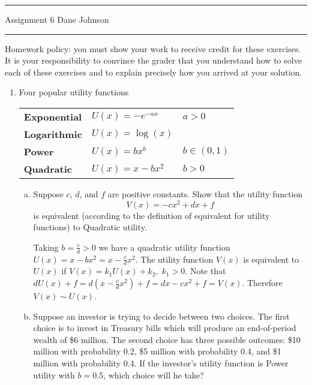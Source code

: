 \documentclass[letterpaper,12pt,fleqn]{article}
\begin{document}
\pagestyle{empty}

\hrule \vspace{0.5em}
 \hfill Assignment 6 \newline Dane Johnson \newline \hrule

\vspace{1em}

Homework policy: you must show your work to receive credit for these exercises.  It is your responsibility to convince the grader that you understand how to solve each of these exercises and to explain precisely how you arrived at your solution.

\vspace{1em}

\begin{enumerate}
\item Four popular utility functions

\begin{tabular}{lll}
\textbf{Exponential} & $U(x) = -e^{-ax}$ & $a > 0$\\
\textbf{Logarithmic} & $U(x) = \log(x)$ & \\
\textbf{Power} & $U(x) = b x^{b}$ & $b \in (0, 1)$ \\
\textbf{Quadratic} & $U(x) = x - bx^{2}$ \hspace{2em} & $b > 0$
\end{tabular}

\vspace{1em}

\begin{enumerate}[a)]
\item Suppose $c$, $d$, and $f$ are positive constants. Show that the utility function
\begin{equation*}
V(x) = -c x^{2} + d x + f
\end{equation*}
is equivalent (according to the definition of equivalent for utility functions) to Quadratic utility.

Taking $b = \frac{c}{d} > 0 $ we have a quadratic utility function $U(x) = x - bx^2 = x - \frac{c}{d}x^2$. The utility function $V(x)$ is equivalent to $U(x)$ if $V(x) = k_1U(x) + k_2, \; k_1 > 0$. Note that $dU(x) + f = d(x-\frac{c}{d}x^2) + f = dx - cx^2 + f = V(x)$. Therefore $V(x) \sim U(x)$.

\item Suppose an investor is trying to decide between two choices. The first choice is to invest in Treasury bills which will produce an end-of-period wealth of \$6 million. The second choice has three possible outcomes: \$10 million with probability 0.2, \$5 million with probability 0.4, and \$1 million with probability 0.4. If the investor's utility function is Power utility with $b = 0.5$, which choice will he take?


\end{enumerate}
\end{enumerate}
\end{document}
